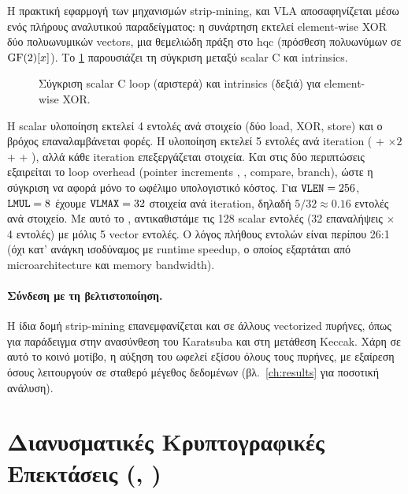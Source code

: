 Η πρακτική εφαρμογή των μηχανισμών strip-mining,  και VLA
αποσαφηνίζεται μέσω ενός πλήρους αναλυτικού παραδείγματος: η συνάρτηση
 εκτελεί element-wise XOR δύο πολυωνυμικών vectors, μια
θεμελιώδη πράξη στο \gls{hqc} (πρόσθεση πολυωνύμων σε $\mathrm{GF}(2)[x]$). Το
\cref{fig:rvv-xor-comparison} παρουσιάζει τη σύγκριση μεταξύ scalar C
και \RVV intrinsics.

\begin{figure}[htbp]
  \centering
  
  \caption[Scalar loop vs.\ RVV intrinsics (XOR)]{Σύγκριση scalar C loop (αριστερά) και \RVV intrinsics (δεξιά)
  για element-wise XOR.}
  \label{fig:rvv-xor-comparison}
\end{figure}

Η scalar υλοποίηση εκτελεί \num{4} εντολές ανά στοιχείο (δύο
load, XOR, store) και ο βρόχος επαναλαμβάνεται  φορές. Η \RVV
υλοποίηση εκτελεί \num{5} εντολές ανά iteration ( +
 $\times 2$ +  + ), αλλά κάθε iteration
επεξεργάζεται \VLMAX στοιχεία. Και στις δύο περιπτώσεις εξαιρείται το loop
overhead (pointer increments , ,
compare, branch), ώστε η σύγκριση να αφορά μόνο το ωφέλιμο υπολογιστικό
κόστος. Για
$\texttt{VLEN} = 256$, $\texttt{LMUL} = 8$ έχουμε $\texttt{VLMAX} = 32$ στοιχεία ανά iteration, δηλαδή 
$5 / 32 \approx 0.16$ εντολές ανά στοιχείο. Με αυτό το \VLMAX,
αντικαθιστάμε τις \num{128} scalar εντολές (\num{32} επαναλήψεις $\times$
\num{4} εντολές) με μόλις \num{5} vector εντολές. Ο λόγος πλήθους εντολών
είναι περίπου \num{26}:1 (όχι κατ' ανάγκη
ισοδύναμος με runtime speedup, ο οποίος εξαρτάται από microarchitecture και
memory bandwidth).

\paragraph{Σύνδεση με τη βελτιστοποίηση.}
Η ίδια δομή strip-mining επανεμφανίζεται και σε άλλους vectorized πυρήνες,
όπως για παράδειγμα στην ανασύνθεση του Karatsuba και στη μετάθεση
Keccak. Χάρη σε αυτό το κοινό μοτίβο, η αύξηση του \VLEN ωφελεί εξίσου
όλους τους πυρήνες, με εξαίρεση όσους λειτουργούν σε σταθερό μέγεθος
δεδομένων (βλ.~\cref{ch:results} για ποσοτική ανάλυση).

\section{Διανυσματικές Κρυπτογραφικές Επεκτάσεις (\Zvbc, \Zvbb)}
\label{sec:vector-crypto-extensions}

